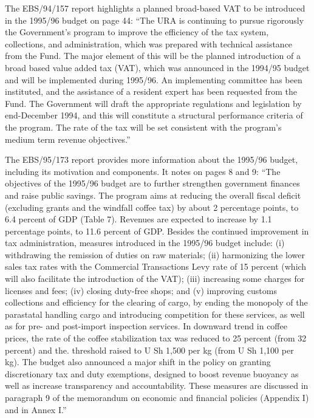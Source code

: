 The EBS/94/157 report highlights a planned broad-based VAT to be introduced in the 1995/96 budget on page 44: “The URA is continuing to pursue rigorously the Government's program to improve the efficiency of the tax system, collections, and administration, which was prepared with technical assistance from the Fund. The major element of this will be the planned introduction of a broad based value added tax (VAT), which was announced in the 1994/95 budget and will be implemented during 1995/96. An implementing committee has been instituted, and the assistance of a resident expert has been requested from the Fund. The Government will draft the appropriate regulations and legislation by end-December 1994, and this will constitute a structural performance criteria of the program. The rate of the tax will be set consistent with the program's medium term revenue objectives.”

The EBS/95/173 report provides more information about the 1995/96 budget, including its motivation and components. It notes on pages 8 and 9: “The objectives of the 1995/96 budget are to further strengthen government finances and raise public savings. The program aims at reducing the overall fiscal deficit (excluding grants and the windfall coffee tax) by about 2 percentage points, to 6.4 percent of GDP (Table 7). Revenues are expected to increase by 1.1 percentage points, to 11.6 percent of GDP. Besides the continued improvement in tax administration, measures introduced in the 1995/96 budget include: (i) withdrawing the remission of duties on raw materials; (ii) harmonizing the lower sales tax rates with the Commercial Transactions Levy rate of 15 percent (which will also facilitate the introduction of the VAT); (iii) increasing some charges for licenses and fees; (iv) closing duty-free shops; and (v) improving customs collections and efficiency for the clearing of cargo, by ending the monopoly of the parastatal handling cargo and introducing competition for these services, as well as for pre- and post-import inspection services. In downward trend in coffee prices, the rate of the coffee stabilization tax was reduced to 25 percent (from 32 percent) and the. threshold raised to U Sh 1,500 per kg (from U Sh 1,100 per kg). The budget also announced a major shift in the policy on granting discretionary tax and duty exemptions, designed to boost revenue buoyancy as well as increase transparency and accountability. These measures are discussed in paragraph 9 of the memorandum on economic and financial policies (Appendix I) and in Annex I.”

